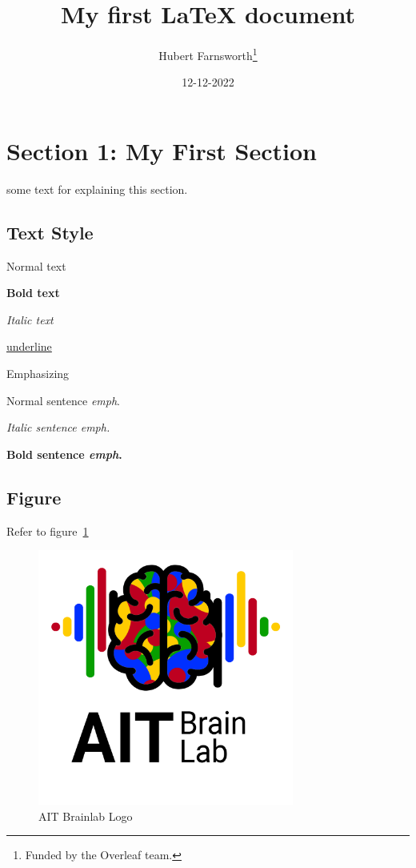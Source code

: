 \documentclass{article}
\title{My first LaTeX document}
\author{Hubert Farnsworth\thanks{Funded by the Overleaf team.}}
\date{12-12-2022}
\begin{document}
\maketitle
\tableofcontents

\section{Section 1: My First Section}

some text for explaining this section.

\subsection{Text Style}

Normal text

\textbf{Bold text}

\textit{Italic text}

\underline{underline}

Emphasizing

Normal sentence \emph{emph}.

\textit{Italic sentence \emph{emph}.}

\textbf{Bold sentence \emph{emph}.}

\subsection{Figure}

Refer to figure~\ref{fig:brainlab-logo}

\begin{figure}[ht!]
    \centering
    \includegraphics[width=0.75\textwidth]{../4_figure/figures/bci-logo.png}
    \caption{AIT Brainlab Logo}
    \label{fig:brainlab-logo}
\end{figure}
\end{document}
